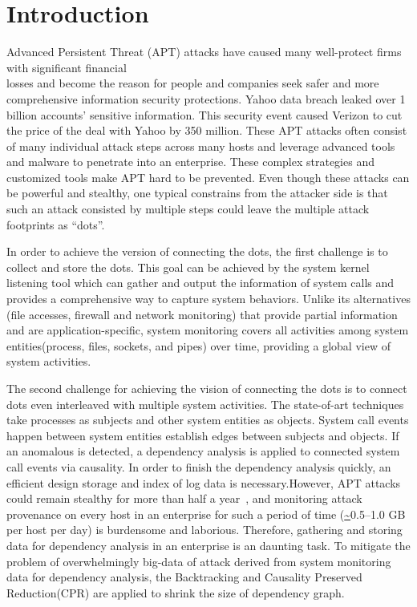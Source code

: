 \section{Introduction}
Advanced Persistent Threat (APT) attacks\cite{fireeye:anatomy,aptsymantec} have caused many well-protect firms with significant financial\\ losses\cite{ebay,opm,target,homedepot} and become the reason for people and companies seek safer and more comprehensive information security protections. Yahoo data breach leaked over 1 billion accounts' sensitive information. This security event caused Verizon to cut the price of the deal with Yahoo by 350 million\cite{ya:yahooleak,aptsymantec}. These APT attacks often consist of many individual attack steps across many hosts and leverage advanced tools and malware to penetrate into an enterprise\cite{fireeye:anatomy,aptsymantec}. These complex strategies and customized tools make APT hard to be prevented. Even though these attacks can be powerful and stealthy, one typical constrains from the attacker side is that such an attack consisted by multiple steps could leave the multiple attack footprints as ``dots''.

In order to achieve the version of connecting the dots, the first challenge is to collect and store the dots. This goal can be achieved by the system kernel listening tool which can gather and output the information of system calls and provides a comprehensive way to capture system behaviors\cite{backtracking,backtracking2}. Unlike its alternatives (file accesses, firewall and network monitoring) that provide partial  information and are application-specific, system monitoring covers all activities among system entities(process, files, sockets, and pipes) over time, providing a global view of system activities.

The second challenge for achieving the vision of connecting the dots is to connect dots even interleaved with multiple system activities. The state-of-art\cite{taser,backtracking,backtracking2} techniques take processes as subjects and other system entities as objects. System call events happen between system entities establish edges between subjects and objects. If an anomalous is detected, a dependency analysis is applied to  connected system call events via causality. In order to finish the dependency analysis quickly, an efficient design storage and index of log data is necessary.However, APT attacks could remain stealthy for more than half a year~\cite{trustwave}, and monitoring attack provenance on every host in an enterprise for such a period of time (\url{~}0.5--1.0 GB per host per day) is burdensome and laborious. Therefore, gathering and storing data for dependency analysis in an enterprise is an daunting task. To mitigate the problem of overwhelmingly big-data of attack derived from system monitoring data for dependency analysis, the Backtracking and Causality Preserved Reduction(CPR) are applied to shrink the size of dependency graph.

